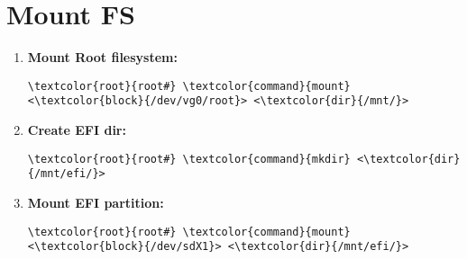 \documentclass[10pt, a4paper, onecolumn, openany]{book} %
\begin{document}
\section{Mount FS}
\label{mount_fs}
\begin{enumerate}
    \item \textbf{Mount Root filesystem:}
\begin{Verbatim}[commandchars=\\\{\}]
\textcolor{root}{root#} \textcolor{command}{mount} <\textcolor{block}{/dev/vg0/root}> <\textcolor{dir}{/mnt/}>
\end{Verbatim}
    \item \textbf{Create EFI dir:}
\begin{Verbatim}[commandchars=\\\{\}]
\textcolor{root}{root#} \textcolor{command}{mkdir} <\textcolor{dir}{/mnt/efi/}>
\end{Verbatim}
    \item \textbf{Mount EFI partition:}
\begin{Verbatim}[commandchars=\\\{\}]
\textcolor{root}{root#} \textcolor{command}{mount} <\textcolor{block}{/dev/sdX1}> <\textcolor{dir}{/mnt/efi/}>
\end{Verbatim}
\end{enumerate}
\end{document}
